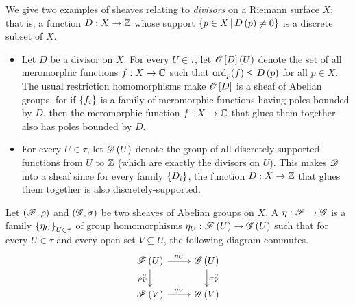 \documentclass[../Moduli_Spaces_of_Riemann_Surfaces.tex]{subfiles}
\begin{document}
    \begin{example}
        We give two examples of sheaves relating to \textit{divisors} on a Riemann surface $X$; that is, a function $D:X\to\mathbb{Z}$ whose support $\left\{p\in X\,\middle\vert\, D\left(p\right)\neq0\right\}$ is a discrete subset of $X$.
        \begin{itemize}
            \item Let $D$ be a divisor on $X$. For every $U\in\tau$, let $\mathscr{O}\left[D\right]\left(U\right)$ denote the set of all meromorphic functions $f:X\to\mathbb{C}$ such that $\operatorname{ord}_p\!\left(f\right)\leq D\left(p\right)$ for all $p\in X$. The usual restriction homomorphisms make $\mathscr{O}\left[D\right]$ is a sheaf of Abelian groups,  for if $\left\{f_i\right\}$ is a family of meromorphic functions having poles bounded by $D$, then the meromorphic function $f:X\to\mathbb{C}$ that glues them together also has poles bounded by $D$.
            \item For every $U\in\tau$, let $\mathscr{D}\left(U\right)$ denote the group of all discretely-supported functions from $U$ to $\mathbb{Z}$ (which are exactly the divisors on $U$). This makes $\mathscr{D}$ into a sheaf since for every family $\left\{D_i\right\}$, the function $D:X\to\mathbb{Z}$ that glues them together is also discretely-supported.\exqed
        \end{itemize}
    \end{example}
    \begin{definition}
        Let $\left(\mathscr{F},\rho\right)$ and $\left(\mathscr{G},\sigma\right)$ be two sheaves of Abelian groups on $X$. A   $\eta:\mathscr{F}\to\mathscr{G}$ is a family $\left\{\eta_U\right\}_{U\in\tau}$ of group homomorphisms $\eta_U:\mathscr{F}\left(U\right)\to\mathscr{G}\left(U\right)$ such that for every $U\in\tau$ and every open set $V\subseteq U$, the following diagram commutes.
        \begin{equation*}
            \begin{tikzcd}
                \ms{F}\l(U\r) \ar[r, "\eta_U"] \ar[d, "\rho^U_V"'] & \ms{G}\l(U\r) \ar[d, "\sigma^U_V"] \\
                \ms{F}\l(V\r) \ar[r, "\eta_V"] & \ms{G}\l(V\r)
            \end{tikzcd}
        \end{equation*}
    \end{definition}
\end{document}
